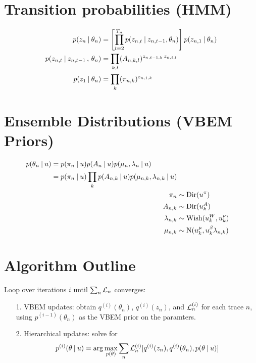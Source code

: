 \section{Transition probabilities (HMM)}
\begin{align}
 p(z_n \:|\: \theta_n) &= \left[
                        \prod_{t=2}^{T_n} p(z_{n,t} \:|\: z_{n,t-1}, \theta_n)
                      \right]
                      p(z_{n,1} \:|\: \theta_n) \\
  p(z_{n,t} \:|\: z_{n,t-1} \,,\, \theta_{n})
      &= \prod_{k,l} (A_{n,k,l})^{z_{n,t-1,k} \, z_{n,t,l}} \\
  p(z_{1} \:|\: \theta_{n}) 
      &= \prod_k (\pi_{n,k})^{z_{n,1,k}}
\end{align}

\section{Ensemble Distributions (VBEM Priors)}
\begin{align}
 \begin{split}
 p(\theta_n \:|\: u)
    &= p(\pi_n \:|\: u) p(A_n \:|\: u) p(\mu_n, \lambda_n \:|\: u) \\
    &= p(\pi_n \:|\: u) \prod_k p(A_{n,k} \:|\: u) p(\mu_{n,k}, \lambda_{n,k} \:|\: u) 
 \end{split}\\
 \pi_n 
    &\sim \mathrm{Dir}(u^{\pi}) \\
 A_{n,k} 
    &\sim \mathrm{Dir}(u^{A}_{k}) \\
 \lambda_{n,k}
    &\sim \mathrm{Wish}(u^{W}_k, u^{\nu}_k) \\
 \mu_{n,k}
    &\sim \mathrm{N}(u^{\mu}_k, u^{\beta}_k \lambda_{n,k}) 
\end{align}

\section{Algorithm Outline}

Loop over iterations $i$ until $\sum_n \mathcal{L}_n$ converges:
\begin{itemize}
 \item[1.] VBEM updates: obtain $q^{(i)}(\theta_n)$, $q^{(i)}(z_n)$, and $\mathcal{L}^{(i)}_n$ for each trace $n$, using $p^{(i-1)}(\theta_n)$ as the VBEM prior on the paramters.
 \item[2.] Hierarchical updates: solve for 
  \[
    p^{(i)}(\theta \:|\: u) = \arg\max_{p(\theta)} \sum_n \mathcal{L}^{(i)}_n[q^{(i)}(z_n), q^{(i)}(\theta_n), p(\theta \:|\: u)]
  \]
\end{itemize}

